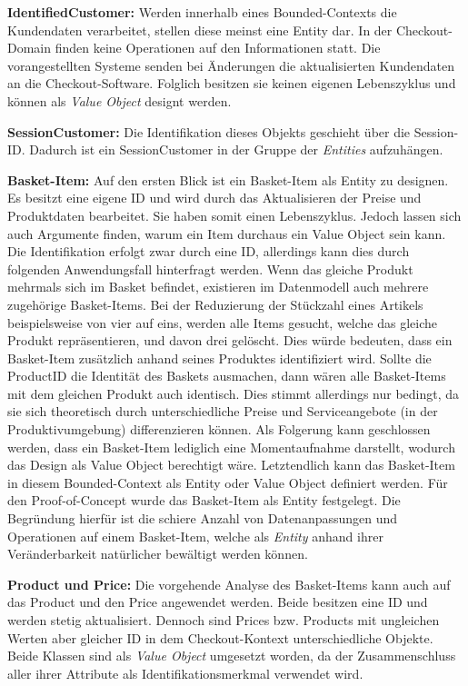 \textbf{IdentifiedCustomer: } {Werden innerhalb eines Bounded-Contexts die Kundendaten verarbeitet, stellen diese meinst eine Entity dar. In der Checkout-Domain finden keine Operationen auf den Informationen statt. Die vorangestellten Systeme senden bei Änderungen die aktualisierten Kundendaten an die Checkout-Software. Folglich besitzen sie keinen eigenen Lebenszyklus und können als \emph{Value Object} designt werden.}

\textbf{SessionCustomer: } {Die Identifikation dieses Objekts geschieht über die Session-ID. Dadurch ist ein SessionCustomer in der Gruppe der \emph{Entities} aufzuhängen. }

\pagebreak

\textbf{Basket-Item: } {Auf den ersten Blick ist ein Basket-Item als Entity zu designen. Es besitzt eine eigene ID und wird durch das Aktualisieren der Preise und Produktdaten bearbeitet. Sie haben somit einen Lebenszyklus. Jedoch lassen sich auch Argumente finden, warum ein Item durchaus ein Value Object sein kann. Die Identifikation erfolgt zwar durch eine ID, allerdings kann dies durch folgenden Anwendungsfall hinterfragt werden. Wenn das gleiche Produkt mehrmals sich im Basket befindet, existieren im Datenmodell auch mehrere zugehörige Basket-Items. Bei der Reduzierung der Stückzahl eines Artikels beispielsweise von vier auf eins, werden alle Items gesucht, welche das gleiche Produkt repräsentieren, und davon drei gelöscht. Dies würde bedeuten, dass ein Basket-Item zusätzlich anhand seines Produktes identifiziert wird. Sollte die ProductID die Identität des Baskets ausmachen, dann wären alle Basket-Items mit dem gleichen Produkt auch identisch. Dies stimmt allerdings nur bedingt, da sie sich theoretisch durch unterschiedliche Preise und Serviceangebote (in der Produktivumgebung) differenzieren können. Als Folgerung kann geschlossen werden, dass ein Basket-Item lediglich eine Momentaufnahme darstellt, wodurch das Design als Value Object berechtigt wäre. Letztendlich kann das Basket-Item in diesem Bounded-Context als Entity oder Value Object definiert werden. Für den Proof-of-Concept wurde das Basket-Item als Entity festgelegt. Die Begründung hierfür ist die schiere Anzahl von Datenanpassungen und Operationen auf einem Basket-Item, welche als \emph{Entity} anhand ihrer Veränderbarkeit natürlicher bewältigt werden können.}

\textbf{Product und Price: } {Die vorgehende Analyse des Basket-Items kann auch auf das Product und den Price angewendet werden. Beide besitzen eine ID und werden stetig aktualisiert. Dennoch sind Prices bzw. Products mit ungleichen Werten aber gleicher ID in dem Checkout-Kontext unterschiedliche Objekte. Beide Klassen sind als \emph{Value Object} umgesetzt worden, da der Zusammenschluss aller ihrer Attribute als Identifikationsmerkmal verwendet wird. }

